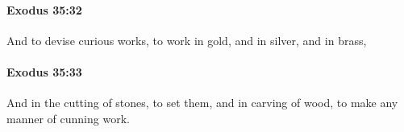 		\paragraph{Exodus 35:32} %
			\label{EXODUS-35-32}

			And to devise curious works, to work in gold, and in silver, and in brass,


		\paragraph{Exodus 35:33} %
			\label{EXODUS-35-33}

			And in the cutting of stones, to set them, and in carving of wood, to make any manner of cunning work.


